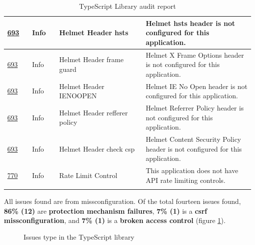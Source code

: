 \documentclass[a4paper, 12pt]{article} %
\begin{document}
\begin{longtable}{||p{0.1\linewidth} | p{0.11\linewidth} | p{0.35\linewidth} | p{0.45\linewidth}||}
                    \hline
                    \href{https://cwe.mitre.org/data/definitions/693.html}{693} & Info &  Helmet Header \acrshort{hsts} & Helmet \acrshort{hsts} header is not configured for this application. \\
                    \hline
                    \href{https://cwe.mitre.org/data/definitions/693.html}{693} & Info &  Helmet Header frame guard & Helmet X Frame Options header is not configured for this application. \\
                    \hline
                    \href{https://cwe.mitre.org/data/definitions/693.html}{693} & Info &  Helmet Header IENOOPEN & Helmet IE No Open header is not configured for this application. \\
                    \hline
                    \href{https://cwe.mitre.org/data/definitions/693.html}{693} & Info &  Helmet Header refferer policy & Helmet Referrer Policy header is not configured for this application. \\
                    \hline
                    \href{https://cwe.mitre.org/data/definitions/693.html}{693} & Info &  Helmet Header  check \acrshort{csp} & Helmet Content Security Policy header is not configured for this application. \\
                    \hline
                    \href{https://cwe.mitre.org/data/definitions/770.html}{770} & Info &  Rate Limit Control & This application does not have API rate limiting controls.\\[1ex]
                    \hline
                    \caption{TypeScript Library audit report}
                    \label{tab:lib}
                \end{longtable}
                
                All issues found are from missconfiguration. Of the total fourteen issues found, \textbf{86\% (12)} are \textbf{protection mechanism failures}, \textbf{7\% (1)} is a \textbf{\acrshort{csrf} missconfiguration}, and \textbf{7\% (1)} is a \textbf{broken access control} (figure \ref{fig:pie-issues-type}).
                \begin{figure}[h!]
                    \centering
                    \caption{Issues type in the TypeScript library}
                    \label{fig:pie-issues-type}
                \end{figure}
                
\end{document}

